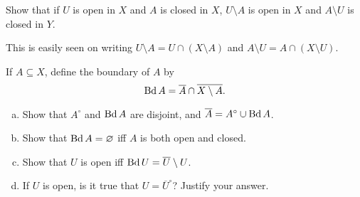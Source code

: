 \begin{exercise}
	Show that if $U$ is open in $X$ and $A$ is closed in $X$, $U\setminus A$ is open in $X$ and $A\setminus U$ is closed in $Y$.
\end{exercise}
\begin{solution*}
	This is easily seen on writing $U\setminus A = U \cap (X\setminus A)$ and $A\setminus U = A \cap (X\setminus U)$.
\end{solution*}

\setcounter{exercise}{18}
\begin{exercise}
	If $A\subseteq X$, define the boundary of $A$ by
	\[ \operatorname{Bd} A = \overline{A} \cap \overline{X\setminus A}.  \]
	\begin{enumerate}[(a)]
		\item Show that $A^\circ$ and $\operatorname{Bd} A$ are disjoint, and $\overline{A} = A^\circ \cup \operatorname{Bd} A$.
		\item Show that $\operatorname{Bd} A = \varnothing$ iff $A$ is both open and closed.
		\item Show that $U$ is open iff $\operatorname{Bd} U = \overline{U}\setminus U$.
		\item If $U$ is open, is it true that $U = \overline{U}^\circ$? Justify your answer.
	\end{enumerate}
\end{exercise}
